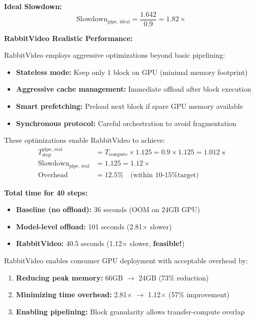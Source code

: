 \textbf{Ideal Slowdown:}
\begin{equation}
\text{Slowdown}_{\text{pipe, ideal}} = \frac{1.642}{0.9} = 1.82\times
\label{eq:pipe_ideal_slowdown}
\end{equation}

\textbf{RabbitVideo Realistic Performance:}

RabbitVideo employs aggressive optimizations beyond basic pipelining:
\begin{itemize}
    \item \textbf{Stateless mode:} Keep only 1 block on GPU (minimal memory footprint)
    \item \textbf{Aggressive cache management:} Immediate offload after block execution
    \item \textbf{Smart prefetching:} Preload next block if spare GPU memory available
    \item \textbf{Synchronous protocol:} Careful orchestration to avoid fragmentation
\end{itemize}

These optimizations enable RabbitVideo to achieve:
\begin{align}
T_{\text{step}}^{\text{pipe, real}} &= T_{\text{compute}} \times 1.125 = 0.9 \times 1.125 = 1.012 \text{ s} \label{eq:pipe_real_time} \\
\text{Slowdown}_{\text{pipe, real}} &= 1.125 = \boxed{1.12\times} \label{eq:pipe_real_slowdown} \\
\text{Overhead} &= \boxed{12.5\%} \quad \text{(within 10-15\% target)} \label{eq:overhead}
\end{align}

\begin{tcolorbox}[colback=green!10!white, colframe=green!75!black, title=\textbf{Success: RabbitVideo Achieves <15\% Overhead}]
\textbf{Total time for 40 steps:}
\begin{itemize}
    \item \textbf{Baseline (no offload):} 36 seconds (OOM on 24GB GPU)
    \item \textbf{Model-level offload:} 101 seconds (2.81$\times$ slower)
    \item \textbf{RabbitVideo:} 40.5 seconds (1.12$\times$ slower, \textbf{feasible!})
\end{itemize}

RabbitVideo enables consumer GPU deployment with acceptable overhead by:
\begin{enumerate}
    \item \textbf{Reducing peak memory:} 66GB $\to$ 24GB (73\% reduction)
    \item \textbf{Minimizing time overhead:} 2.81$\times$ $\to$ 1.12$\times$ (57\% improvement)
    \item \textbf{Enabling pipelining:} Block granularity allows transfer-compute overlap
\end{enumerate}
\end{tcolorbox}

